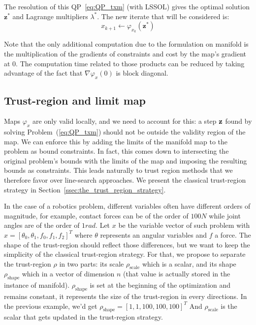 The resolution of this QP~\ref{eq:QP_txm} (with LSSOL) gives the optimal solution $\mathbf{z}^*$ and Lagrange multipliers $\lambda^*$.
The new iterate that will be considered is:
\begin{equation}
  x_{k+1}\leftarrow \varphi_{x_k}(\mathbf{z}^*)
\end{equation}

Note that the only additional computation due to the formulation on manifold is the multiplication of the gradients of constraints and cost by the map's gradient at $0$.
The computation time related to those products can be reduced by taking advantage of the fact that $\nabla \varphi_x(0)$ is block diagonal.

\subsection{Trust-region and limit map}
\label{sub:trust_region_and_limit_map}

Maps $\varphi_{x}$ are only valid locally, and we need to account for this: a step ${\bf z}$ found by solving Problem~(\ref{eq:QP_txm}) should not be outside the validity region of the map.
We can enforce this by adding the limits of the manifold map to the problem as bound constraints.
In fact, this comes down to intersecting the original problem's bounds with the limits of the map and imposing the resulting bounds as constraints.
This leads naturally to trust region methods that we therefore favor over line-search approaches.
We present the classical trust-region strategy in Section~\ref{ssec:the_trust_region_strategy}.

In the case of a robotics problem, different variables often have different orders of magnitude, for example, contact forces can be of the order of $100N$ while joint angles are of the order of $1rad$.
Let $x$ be the variable vector of such problem with $x={[\theta_0, \theta_1, f_0, f_1, f_2]}^T$ where $\theta$ represents an angular variables and $f$ a force.
The shape of the trust-region should reflect those differences, but we want to keep the simplicity of the classical trust-region strategy.
For that, we propose to separate the trust-region $\rho$ in two parts: its scale $\rho_\text{scale}$ which is a scalar, and its shape $\rho_\text{shape}$ which in a vector of dimension $n$ (that value is actually stored in the instance of manifold).
$\rho_\text{shape}$ is set at the beginning of the optimization and remains constant, it represents the size of the trust-region in every directions.
In the previous example, we'd get ${\rho_\text{shape}} = {[1,1,100,100,100]}^T$
And $\rho_\text{scale}$ is the scalar that gets updated in the trust-region strategy.

